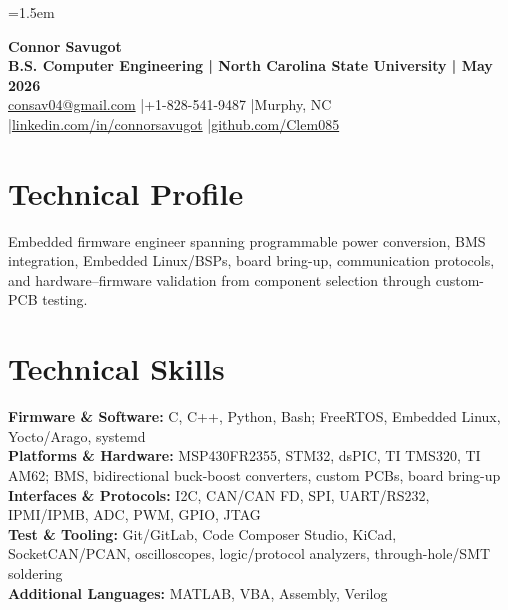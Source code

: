 \documentclass[10pt,letterpaper]{article}
\begin{document}
\fontsize{10}{10.8}\selectfont
\setlength{\RaggedRightRightskip}{0pt plus 5em}
\RaggedRight
\emergencystretch=1.5em

\begin{center}
  {\fontsize{21}{22}\selectfont\bfseries Connor Savugot}\\[2pt]
  {\bfseries B.S. Computer Engineering | North Carolina State University | May 2026}\\[2pt]
  \href{mailto:consav04@gmail.com}{consav04@gmail.com}
  \enspace|\enspace +1-828-541-9487
  \enspace|\enspace Murphy, NC
  \enspace|\enspace \href{https://linkedin.com/in/connorsavugot}{linkedin.com/in/connorsavugot}
  \enspace|\enspace \href{https://github.com/Clem085}{github.com/Clem085}
\end{center}
\vspace{-0.17cm}

\section{Technical Profile}
Embedded firmware engineer spanning programmable power conversion, BMS integration, Embedded Linux/BSPs, board bring-up, communication protocols, and hardware--firmware validation from component selection through custom-PCB testing.

\section{Technical Skills}
\textbf{Firmware \& Software:} C, C++, Python, Bash; FreeRTOS, Embedded Linux, Yocto/Arago, systemd\\
\textbf{Platforms \& Hardware:} MSP430FR2355, STM32, dsPIC, TI TMS320, TI AM62; BMS, bidirectional buck-boost converters, custom PCBs, board bring-up\\
\textbf{Interfaces \& Protocols:} I2C, CAN/CAN FD, SPI, UART/RS232, IPMI/IPMB, ADC, PWM, GPIO, JTAG\\
\textbf{Test \& Tooling:} Git/GitLab, Code Composer Studio, KiCad, SocketCAN/PCAN, oscilloscopes, logic/protocol analyzers, through-hole/SMT soldering\\
\textbf{Additional Languages:} MATLAB, VBA, Assembly, Verilog
\end{document}
